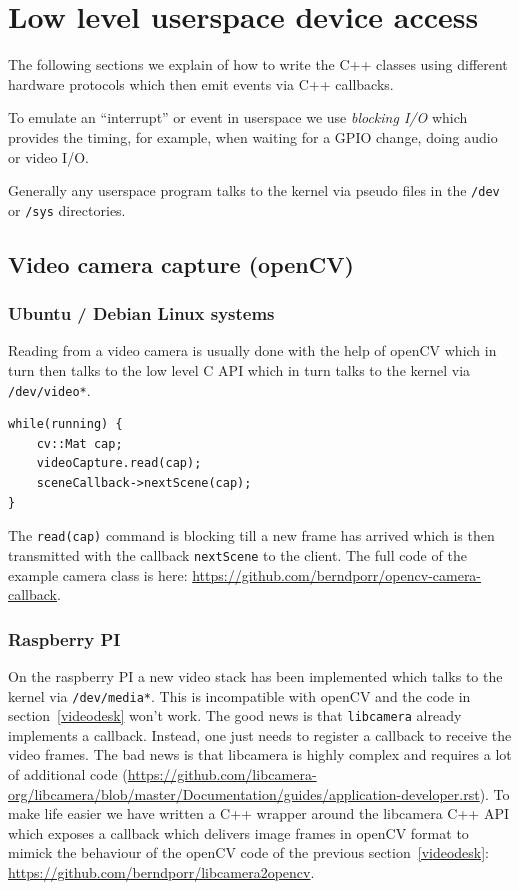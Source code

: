 \documentclass[12pt]{report}
\begin{document}
\section{Low level userspace device access}
The following sections we explain of how to write
the C++ classes using different hardware protocols which then emit events via C++ callbacks.

To emulate an ``interrupt'' or event in userspace we use
\textsl{blocking I/O} which provides the timing, for example, when
waiting for a GPIO change, doing audio or video I/O.

Generally any userspace program talks to the kernel via pseudo files
in the \texttt{/dev} or \texttt{/sys} directories.

\subsection{Video camera capture (openCV)}
\subsubsection{Ubuntu / Debian Linux systems\label{videodesk}}
Reading from a video camera is usually done with the help of openCV which
in turn then talks to the low level C API which in turn talks to the kernel
via \texttt{/dev/video*}.
\begin{verbatim}
while(running) {
    cv::Mat cap;
    videoCapture.read(cap);
    sceneCallback->nextScene(cap);
}
\end{verbatim}
The \texttt{read(cap)} command is blocking till a new frame has
arrived which is then transmitted with the callback \texttt{nextScene}
to the client. The full code of the example camera class is here:
\url{https://github.com/berndporr/opencv-camera-callback}.


\subsubsection{Raspberry PI}
On the raspberry PI a new video stack has been implemented which talks
to the kernel via \texttt{/dev/media*}. This is incompatible with
openCV and the code in section~\ref{videodesk} won't work. The good
news is that \texttt{libcamera} already implements a callback. Instead, one just needs to register a
callback to receive the video frames. The bad news is that libcamera
is highly complex and requires a lot of additional code
(\url{https://github.com/libcamera-org/libcamera/blob/master/Documentation/guides/application-developer.rst}).
To make life easier we have written a C++ wrapper around the libcamera C++ API
which exposes a callback which delivers image frames in openCV format to
mimick the behaviour of the openCV code of the previous
section~\ref{videodesk}:
\url{https://github.com/berndporr/libcamera2opencv}.
\end{document}
